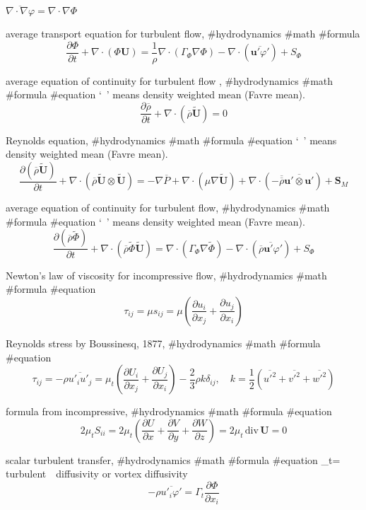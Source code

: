 $
\overline{\nabla\cdot \nabla\varphi}=\nabla\cdot \nabla\Phi
$

average transport equation for turbulent flow, #hydrodynamics #math #formula
$$
\frac{\partial \Phi}{\partial t}+\nabla\cdot(\Phi {\boldsymbol U})=\frac{1}{\rho}\nabla\cdot(\Gamma_\Phi \nabla \Phi)-\nabla\cdot(\overline{{\boldsymbol u}'\varphi'})+S_\Phi
$$

average equation of continuity  for turbulent flow , #hydrodynamics #math #formula #equation
‘~’ means density weighted mean (Favre mean).
$$
\frac{\partial {\overline \rho}}{\partial t}+\nabla\cdot({\overline \rho}{\tilde {\boldsymbol U}})=0
$$

Reynolds equation, #hydrodynamics #math #formula #equation
‘~’ means density weighted mean (Favre mean).
$$
\frac{\partial ({\overline \rho}{\tilde {\boldsymbol U}})}{\partial t}+\nabla\cdot({\overline \rho}{\tilde {\boldsymbol U}}\otimes{\tilde {\boldsymbol U}})=-\nabla {\overline P}+\nabla\cdot(\mu \nabla {\tilde {\boldsymbol U}})+\nabla\cdot(-{\overline {\overline \rho} \overline{{\boldsymbol u}' \otimes {\boldsymbol u}'}})+{\boldsymbol S}_M
$$

average equation of continuity  for turbulent flow, #hydrodynamics #math #formula #equation
‘~’ means density weighted mean (Favre mean).
$$
\frac{\partial ({\overline \rho}{\tilde \Phi})}{\partial t}+\nabla\cdot({\overline \rho}{\tilde \Phi} {\tilde {\boldsymbol U}})=\nabla\cdot(\Gamma_\Phi \nabla {\tilde \Phi})-\nabla\cdot(\overline{{\overline \rho}{\boldsymbol u}'\varphi'})+S_\Phi
$$

Newton’s law of viscosity for incompressive flow, #hydrodynamics #math #formula #equation
$$
\tau_{ij}=\mu s_{ij}=\mu\left(\frac{\partial u_i}{\partial x_j}+\frac{\partial u_j}{\partial x_i}\right)
$$

Reynolds stress by Boussinesq, 1877, #hydrodynamics #math #formula #equation
$$
\tau_{ij}=-\rho {\overline {u'_i u'_j}}=\mu_t\left(\frac{\partial U_i}{\partial x_j}+\frac{\partial U_j}{\partial x_i}\right)-\frac{2}{3}\rho k \delta_{ij}, \quad k=\frac{1}{2}(\overline{u'^2}+\overline{v'^2}+\overline{w'^2})
$$

formula from incompressive, #hydrodynamics #math #formula #equation
$$
2\mu_t S_{ii}=2\mu_t\left(\frac{\partial U}{\partial x}+\frac{\partial V}{\partial y}+\frac{\partial W}{\partial z}\right)=2\mu_t \, {\mathrm {div}}\,{\boldsymbol U}=0
$$

scalar turbulent transfer, #hydrodynamics #math #formula #equation
\Gamma_t= turbulent　diffusivity or vortex diffusivity
$$
-\rho\overline{u'_i \varphi'}=\Gamma_t \frac{\partial \Phi}{\partial x_i}
$$


